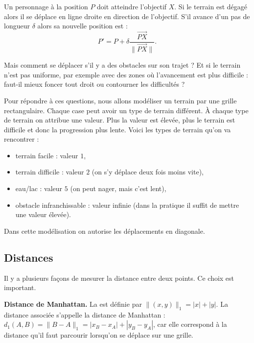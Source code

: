 \documentclass[11pt,class=report,crop=false]{standalone}
\begin{document}
Un personnage à la position $P$ doit atteindre l'objectif $X$.
Si le terrain est dégagé alors il se déplace en ligne droite en direction de l'objectif. S'il avance d'un pas de longueur $\delta$ alors sa nouvelle position est :
$$P' = P + \delta \frac{\vec{PX}}{\| \vec{PX} \|}.$$


Mais comment se déplacer s'il y a des obstacles sur son trajet ? 
Et si le terrain n'est pas uniforme, par exemple avec des zones où l'avancement est plus difficile : faut-il mieux foncer tout droit ou contourner les difficultés ?

Pour répondre à ces questions, nous allons modéliser un terrain par une grille rectangulaire. Chaque case peut avoir un type de terrain différent.
À chaque type de terrain on attribue une valeur. Plus la valeur est élevée, plus le terrain est difficile et donc la progression plus lente.
Voici les types de terrain qu'on va rencontrer :
\begin{itemize}
	\item terrain facile : valeur $1$,
	\item terrain difficile : valeur $2$ (on s'y déplace deux fois moins vite),
	\item eau/lac : valeur $5$ (on peut nager, mais c'est lent),
	\item obstacle infranchissable : valeur infinie (dans la pratique il suffit de mettre une valeur élevée).
\end{itemize}


Dans cette modélisation on autorise les déplacements en diagonale.

\subsection{Distances}

Il y a plusieurs façons de mesurer la distance entre deux points.
Ce choix est important.



\textbf{Distance de Manhattan.}
La  est définie par $\| (x,y) \|_1 = |x| + |y|$.
La distance associée s'appelle la distance de Manhattan :
$d_1(A,B) = \| B - A \|_1 = |x_B-x_A| + |y_B-y_A|$,
car elle correspond à la distance qu'il faut parcourir lorsqu'on se déplace sur une grille.
\end{document}
